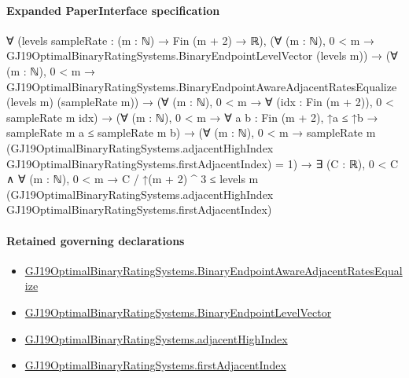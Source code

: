 \documentclass[10pt]{article}
\begin{document}
\paragraph{Expanded PaperInterface specification}
\begin{ReviewVerbatim}
∀ (levels sampleRate : (m : ℕ) → Fin (m + 2) → ℝ),
  (∀ (m : ℕ), 0 < m → GJ19OptimalBinaryRatingSystems.BinaryEndpointLevelVector (levels m)) →
    (∀ (m : ℕ),
        0 < m → GJ19OptimalBinaryRatingSystems.BinaryEndpointAwareAdjacentRatesEqualize (levels m) (sampleRate m)) →
      (∀ (m : ℕ), 0 < m → ∀ (idx : Fin (m + 2)), 0 < sampleRate m idx) →
        (∀ (m : ℕ), 0 < m → ∀ {a b : Fin (m + 2)}, ↑a ≤ ↑b → sampleRate m a ≤ sampleRate m b) →
          (∀ (m : ℕ),
              0 < m →
                sampleRate m
                    (GJ19OptimalBinaryRatingSystems.adjacentHighIndex
                      GJ19OptimalBinaryRatingSystems.firstAdjacentIndex) =
                  1) →
            ∃ (C : ℝ),
              0 < C ∧
                ∀ (m : ℕ),
                  0 < m →
                    C / ↑(m + 2) ^ 3 ≤
                      levels m
                        (GJ19OptimalBinaryRatingSystems.adjacentHighIndex
                          GJ19OptimalBinaryRatingSystems.firstAdjacentIndex)
\end{ReviewVerbatim}

\paragraph{Retained governing declarations}
\begin{itemize}\raggedright
\item \hyperlink{governing-declaration-5a62c276eedad684}{GJ19\allowbreak{}Optimal\allowbreak{}Binary\allowbreak{}Rating\allowbreak{}Systems.\allowbreak{}Binary\allowbreak{}Endpoint\allowbreak{}Aware\allowbreak{}Adjacent\allowbreak{}Rates\allowbreak{}Equalize}
\item \hyperlink{governing-declaration-aa797f827cdcda67}{GJ19\allowbreak{}Optimal\allowbreak{}Binary\allowbreak{}Rating\allowbreak{}Systems.\allowbreak{}Binary\allowbreak{}Endpoint\allowbreak{}Level\allowbreak{}Vector}
\item \hyperlink{governing-declaration-28fccf34ba067e47}{GJ19\allowbreak{}Optimal\allowbreak{}Binary\allowbreak{}Rating\allowbreak{}Systems.\allowbreak{}adjacent\allowbreak{}High\allowbreak{}Index}
\item \hyperlink{governing-declaration-f116ab8d00b42dc7}{GJ19\allowbreak{}Optimal\allowbreak{}Binary\allowbreak{}Rating\allowbreak{}Systems.\allowbreak{}first\allowbreak{}Adjacent\allowbreak{}Index}
\end{itemize}
\end{document}
